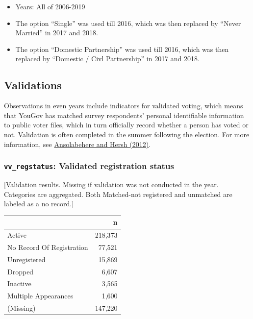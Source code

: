 \documentclass[10pt,article,oneside]{memoir}
\theoremstyle{definition}
\begin{document}
\begin{itemize}
\tightlist
\item
  Years: All of 2006-2019
\item
  The option ``Single'' was used till 2016, which was then replaced by
  ``Never Married'' in 2017 and 2018.
\item
  The option ``Domestic Partnership'' was used till 2016, which was then
  replaced by ``Domestic / Civl Partnership'' in 2017 and 2018.
\end{itemize}

\newpage

\hypertarget{validations}{%
\subsection{Validations}\label{validations}}

Observations in even years include indicators for validated voting,
which means that YouGov has matched survey respondents' personal
identifiable information to public voter files, which in turn officially
record whether a person has voted or not. Validation is often completed
in the summer following the election. For more information, see
\href{https://doi.org/10.1093/pan/mps023}{Ansolabehere and Hersh
(2012)}.

\hypertarget{vv_regstatus-validated-registration-status}{%
\subsubsection{\texorpdfstring{\texttt{vv\_regstatus}: Validated
registration
status}{vv\_regstatus: Validated registration status}}\label{vv_regstatus-validated-registration-status}}

{[}Validation results. Missing if validation was not conducted in the
year. Categories are aggregated. Both Matched-not registered and
unmatched are labeled as a no record.{]}

\begin{table}[H]
\centering
\begin{tabular}{lr}
\toprule
 & n\\
\midrule
Active & 218,373\\
No Record Of Registration & 77,521\\
Unregistered & 15,869\\
Dropped & 6,607\\
Inactive & 3,565\\
Multiple Appearances & 1,600\\
(Missing) & 147,220\\
\bottomrule
\end{tabular}
\end{table}
\end{document}
